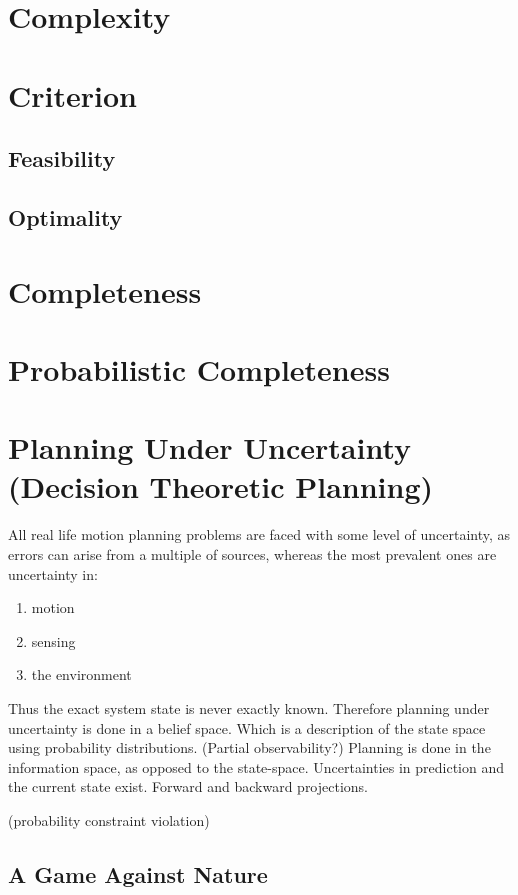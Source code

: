 \section{Complexity}

\section{Criterion}

\subsection{Feasibility}
\subsection{Optimality}

\section{Completeness}

\section{Probabilistic Completeness}

\section{Planning Under Uncertainty (Decision Theoretic Planning)}

All real life motion planning problems are faced with some level of uncertainty,
as errors can arise from a multiple of sources, whereas the most prevalent ones
are uncertainty in:
\begin{enumerate}
\item motion
\item sensing
\item the environment
\end{enumerate}
Thus the exact system state is never exactly known. Therefore planning under
uncertainty is done in a belief space. Which is a description of the state space
using probability distributions. (Partial observability?) Planning is done in
the information space, as opposed to the state-space. Uncertainties in
prediction and the current state exist. Forward and backward projections.

(probability constraint violation)

\subsection{A Game Against Nature}

